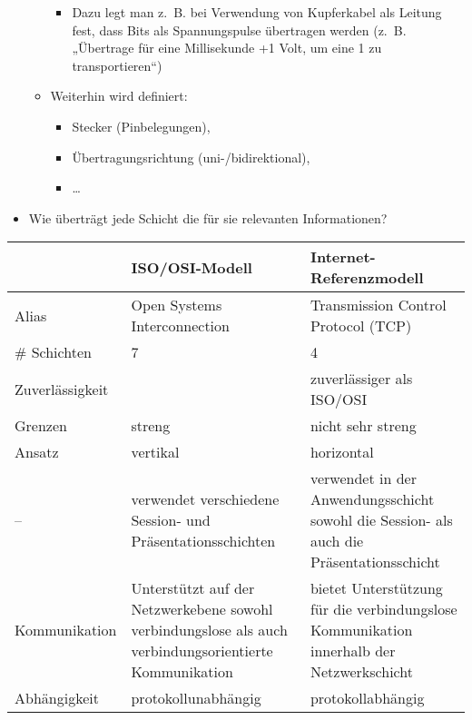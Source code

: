 \begin{itemize}
\begin{itemize}
        \begin{itemize}
            \item Dazu legt man z.\ B. bei Verwendung von Kupferkabel als Leitung fest, dass Bits als Spannungspulse übertragen werden (z.\ B. „Übertrage für eine Millisekunde +1 Volt, um eine 1 zu transportieren“)
        \end{itemize}
        \item Weiterhin wird definiert:
        \begin{itemize}
            \item Stecker (Pinbelegungen),
            \item Übertragungsrichtung (uni-/bidirektional),
            \item \ldots
        \end{itemize}
    \end{itemize}
\end{itemize}

\begin{itemize}
    \item {} Wie überträgt jede Schicht die für sie relevanten Informationen?
\end{itemize}

\bigbreak
\begin{center}
    \begin{tabularx}{\textwidth}{|X|X|X|}
        \hline
        & ISO/OSI-Modell & Internet-Referenzmodell \tabularnewline
        \hline
        Alias & Open Systems Interconnection & Transmission Control Protocol (TCP) \tabularnewline
        \hline
        \# Schichten & 7 & 4 \tabularnewline
        \hline
        Zuverlässigkeit & & zuverlässiger als ISO/OSI \tabularnewline
        \hline
        Grenzen & streng & nicht sehr streng \tabularnewline
        \hline
        Ansatz & vertikal & horizontal \tabularnewline
        \hline
        – & verwendet verschiedene Session- und Präsentationsschichten & verwendet in der Anwendungsschicht sowohl die Session- als auch die Präsentationsschicht \tabularnewline
        \hline
        Kommunikation & Unterstützt auf der Netzwerkebene sowohl verbindungslose als auch verbindungsorientierte Kommunikation & bietet Unterstützung für die verbindungslose Kommunikation innerhalb der Netzwerkschicht \tabularnewline
        \hline
        Abhängigkeit & protokollunabhängig & protokollabhängig \tabularnewline
        \hline
    \end{tabularx}
\end{center}

